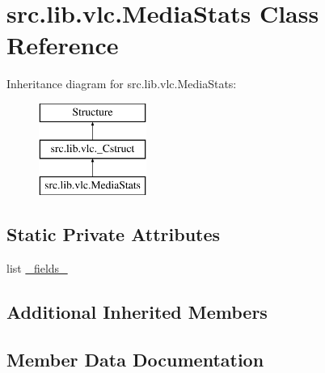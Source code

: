 \hypertarget{classsrc_1_1lib_1_1vlc_1_1MediaStats}{}\section{src.\+lib.\+vlc.\+Media\+Stats Class Reference}
\label{classsrc_1_1lib_1_1vlc_1_1MediaStats}
Inheritance diagram for src.\+lib.\+vlc.\+Media\+Stats\+:\begin{figure}[H]
\begin{center}
\leavevmode
\includegraphics[height=3.000000cm]{classsrc_1_1lib_1_1vlc_1_1MediaStats}
\end{center}
\end{figure}
\subsection*{Static Private Attributes}
\begin{DoxyCompactItemize}
\item 
list \hyperlink{classsrc_1_1lib_1_1vlc_1_1MediaStats_a1f711ea68d94e8320bed627fd7be7b4d}{\+\_\+fields\+\_\+}
\end{DoxyCompactItemize}
\subsection*{Additional Inherited Members}


\subsection{Member Data Documentation}
\hypertarget{classsrc_1_1lib_1_1vlc_1_1MediaStats_a1f711ea68d94e8320bed627fd7be7b4d}{}
